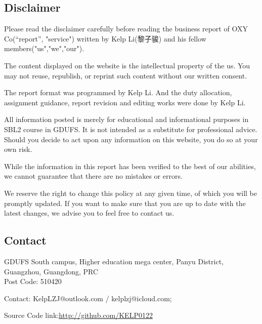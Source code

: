 \documentclass[
	a4paper, %
	12pt,%
]{CSSullivanBusinessReport}
\begin{document}
\thispagestyle{empty} %

	\footnotesize %
	
	\subsection*{Disclaimer}
    Please read the disclaimer carefully before reading the business report of OXY Co(“report”, "service") written by Kelp Li(黎子骏) and his fellow members("us","we","our").
\par
The content displayed on the website is the intellectual property of the us. You may not reuse, republish, or reprint such content without our written consent.
\par
The report format was programmed by Kelp Li. And the duty allocation, assignment guidance, report revision and editing works were done by Kelp Li.
\par
All information posted is merely for educational and informational purposes in SBL2 course in GDUFS. It is not intended as a substitute for professional advice. Should you decide to act upon any information on this website, you do so at your own risk.
\par
While the information in this report has been verified to the best of our abilities, we cannot guarantee that there are no mistakes or errors.
\par
We reserve the right to change this policy at any given time, of which you will be promptly updated. If you want to make sure that you are up to date with the latest changes, we advise you to feel free to contact us.
	
	\subsection*{Contact}
	
	GDUFS South campus, Higher education mega center, Panyu District, Guangzhou, Guangdong, PRC\\

	
	Post Code: 510420
	
	Contact: KelpLZJ@outlook.com / kelplzj@icloud.com;

	Source Code link:\url{http://github.com/KELP0122}
	
	\vfill %
	
\end{document}

